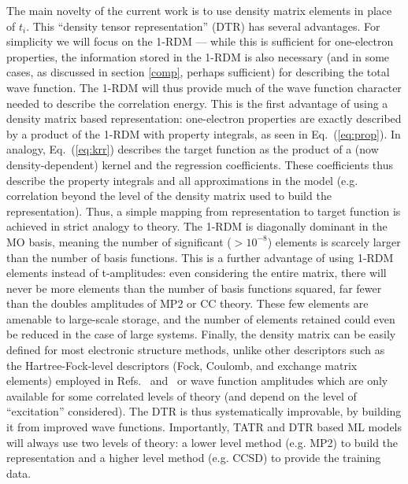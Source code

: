The main novelty of the current work is to use density matrix elements in place of $t_i$. This ``density tensor representation'' (DTR) has several advantages. For simplicity we will focus on the 1-RDM --- while this is sufficient for one-electron properties, the information stored in the 1-RDM is also necessary (and in some cases, as discussed in section \ref{comp}, perhaps sufficient) for describing the total wave function.
The 1-RDM will thus provide much of the wave function character needed to describe the correlation energy.
This is the first advantage of using a density matrix based representation: one-electron properties are exactly described by a product of the 1-RDM with property integrals, as seen in Eq.~(\ref{eq:prop}). 
In analogy, Eq.~(\ref{eq:krr}) describes the target function as the product of a (now density-dependent) kernel and the regression coefficients. 
These coefficients thus describe the property integrals and all approximations in the model (e.g. correlation beyond the level of the density matrix used to build the representation). Thus, a simple mapping from representation to target function is achieved in strict analogy to theory.
The 1-RDM is diagonally dominant in the MO basis, meaning the number of significant ($>10^{-8}$) elements is scarcely larger than the number of basis functions. 
This is a further advantage of using 1-RDM elements instead of t-amplitudes: even considering the entire matrix, there will never be more elements than the number of basis functions squared, far fewer than the doubles amplitudes of MP2 or CC theory. These few elements are amenable to large-scale storage, and the number of elements retained could even be reduced in the case of large systems.
Finally, the density matrix can be easily defined for most electronic structure methods, unlike other descriptors such as the Hartree-Fock-level descriptors (Fock, Coulomb, and exchange matrix elements) employed in Refs.~ and~ or wave function amplitudes which are only available for some correlated levels of theory (and depend on the level of ``excitation'' considered). The DTR is thus systematically improvable, by building it from improved wave functions. Importantly, TATR and DTR based ML models will always use two levels of theory: a lower level method (e.g. MP2) to build the representation and a higher level method (e.g. CCSD) to provide the training data. 

